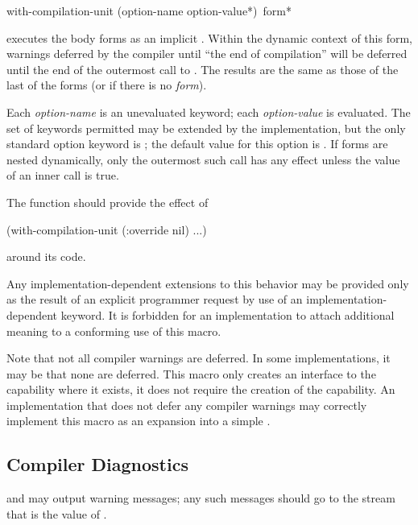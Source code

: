 \begin{defmac}
with-compilation-unit ({option-name option-value}*) {\,form}*

 executes the body forms as an implicit . Within the dynamic context
   of this form, warnings deferred by the compiler until ``the end of
   compilation'' will be deferred until the end of the outermost call
   to . The results are the same as those of
   the last of the forms (or  if there is no \emph{form}).

   Each \emph{option-name} is an unevaluated keyword; each \emph{option-value}
   is evaluated. The set of keywords permitted may be extended by the
   implementation, but the only standard option keyword is ;
   the default value for this option is .
   If  forms are nested dynamically, only the outermost
   such call has any effect unless the  value of an
   inner call is true.

  The function  should
  provide the effect of
  \begin{lisp}
  (with-compilation-unit (:override nil) ...)
  \end{lisp}
  around its code.

  Any implementation-dependent extensions to this behavior may be provided only
  as the result of an explicit programmer request by use of 
  an implementation-dependent keyword.  It is forbidden for an implementation
  to attach additional meaning to a conforming use of this
  macro.

  Note that not all compiler warnings are deferred. In some implementations,
  it may be that none are deferred. This macro only creates an
  interface to the capability where it exists, it does not require the
  creation of the capability. An implementation that does not 
  defer any compiler warnings may correctly implement this macro
  as an expansion into a simple .
\end{defmac}

\subsection{Compiler Diagnostics}
\label{COMPILER-DIAGNOSTICS-SECTION}

 and 
may output warning messages; any such messages should
go to the stream that is the value of .

